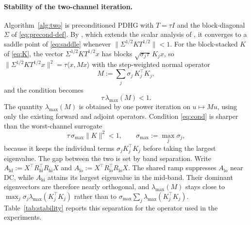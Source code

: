 \documentclass{article}
\begin{document}
\paragraph{Stability of the two-channel iteration.}
Algorithm~\ref{alg:two} is preconditioned PDHG with $T=\tau I$ and the block-diagonal $\Sigma$ of \eqref{eq:precond-def}. By \citet{pock2011diagonal}, which extends the scalar analysis of \citet{chambolle2011first}, it converges to a saddle point of \eqref{eq:saddle} whenever $\|\Sigma^{1/2}KT^{1/2}\|<1$. For the block-stacked $K$ of \eqref{eq:K}, the vector $\Sigma^{1/2}KT^{1/2}x$ has blocks $\sqrt{\sigma_j\tau}\,K_jx$, so $\|\Sigma^{1/2}KT^{1/2}x\|^2=\tau\langle x,Mx\rangle$ with the step-weighted normal operator
\begin{equation}
\label{eq:M}
M:=\sum_{j}\sigma_j\,K_j^\top K_j ,
\end{equation}
and the condition becomes
\begin{equation}
\label{eq:cond}
\tau\,\lambda_{\max}(M)<1 .
\end{equation}
The quantity $\lambda_{\max}(M)$ is obtained by one power iteration on $u\mapsto Mu$, using only the existing forward and adjoint operators. Condition \eqref{eq:cond} is sharper than the worst-channel surrogate
\begin{equation}
\label{eq:worst-channel}
\tau\,\sigma_{\max}\|K\|^2<1,\qquad \sigma_{\max}:=\max_j\sigma_j,
\end{equation}
because it keeps the individual terms $\sigma_jK_j^\top K_j$ before taking the largest eigenvalue. The gap between the two is set by band separation. Write $A_{\mathrm{hi}}:=X^\top R_{\mathrm{hi}}^\top R_{\mathrm{hi}}X$ and $A_{\mathrm{lo}}:=X^\top R_{\mathrm{lo}}^\top R_{\mathrm{lo}}X$. The shared ramp suppresses $A_{\mathrm{lo}}$ near DC, while $A_{\mathrm{hi}}$ attains its largest eigenvalue in the mid-band. Their dominant eigenvectors are therefore nearly orthogonal, and $\lambda_{\max}(M)$ stays close to $\max_j\sigma_j\lambda_{\max}(K_j^\top K_j)$ rather than to $\sigma_{\max}\sum_j\lambda_{\max}(K_j^\top K_j)$. Table~\ref{tab:stability} reports this separation for the operator used in the experiments.
\end{document}
